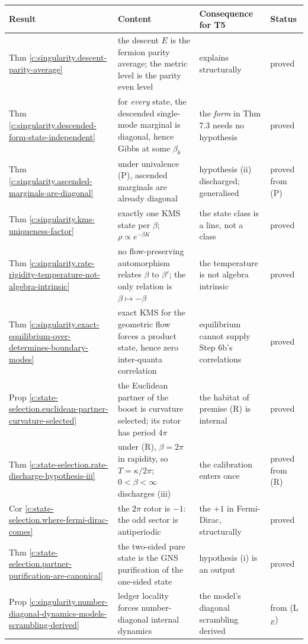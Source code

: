 \documentclass[11pt]{article}
\theoremstyle{definition}
\theoremstyle{plain}
\begin{document}
 \begin{tabular}{l>{ \arraybackslash}p{6.4cm}>{ \arraybackslash}p{4.6cm}l}
\toprule
Result & Content & Consequence for T5 & Status \\
\midrule
Thm \ref{c:singularity.descent-parity-average} & the descent $E$ is the fermion parity average; the metric level is the parity even level & explains \cite[Fact 5.9]{ButlerT5} structurally & proved \\
Thm \ref{c:singularity.descended-form-state-independent} & for \emph{every} state, the descended single-mode marginal is diagonal, hence Gibbs at some $\beta_k$ & the \emph{form} in Thm 7.3 needs no hypothesis & proved \\
Thm \ref{c:singularity.ascended-marginals-are-diagonal} & under univalence (P), ascended marginals are already diagonal & hypothesis (ii) discharged; \cite[Lem.~12.1]{ButlerT5} generalised & proved from (P) \\
Thm \ref{c:singularity.kms-uniqueness-factor} & exactly one KMS state per $\beta$; $\rho \propto e^{-\beta K}$ & the state class is a line, not a class & proved \\
Thm \ref{c:singularity.rate-rigidity-temperature-not-algebra-intrinsic} & no flow-preserving automorphism relates $\beta$ to $\beta'$; the only relation is $\beta \mapsto -\beta$ & the temperature is not algebra intrinsic & proved \\
Thm \ref{c:singularity.exact-equilibrium-over-determines-boundary-modes} & exact KMS for the geometric flow forces a product state, hence zero inter-quanta correlation & equilibrium cannot supply Step 6b's correlations & proved \\
Prop \ref{c:state-selection.euclidean-partner-curvature-selected} & the Euclidean partner of the boost is curvature selected; its rotor has period $4\pi$ & the habitat of premise (R) is internal & proved \\
Thm \ref{c:state-selection.rate-discharge-hypothesis-iii} & under (R), $\beta = 2\pi$ in rapidity, so $T = \kappa/2\pi$; $0 < \beta < \infty$ discharges (iii) & the calibration enters once & proved from (R) \\
Cor \ref{c:state-selection.where-fermi-dirac-comes} & the $2\pi$ rotor is $-1$: the odd sector is antiperiodic & the $+1$ in Fermi-Dirac, structurally & proved \\
Thm \ref{c:state-selection.partner-purification-are-canonical} & the two-sided pure state is the GNS purification of the one-sided state & hypothesis (i) is an output & proved \\
Prop \ref{c:singularity.number-diagonal-dynamics-models-scrambling-derived} & ledger locality forces number-diagonal internal dynamics & the model's diagonal scrambling derived & from (L$_E$) \\
\bottomrule
\end{tabular}
\end{document}
